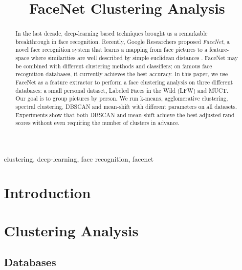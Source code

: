 \documentclass[conference]{IEEEtran}
\begin{document}
\title{FaceNet Clustering Analysis}

\author{
}


\maketitle

\begin{abstract}
In the last decade, deep-learning based techniques brought us a remarkable breakthrough in face recognition.
Recently, Google Researchers proposed \textit{FaceNet}, a novel face recognition system that learns a mapping from face pictures to a feature-space where similarities are well described by simple euclidean distances \cite{??}.
FaceNet may be combined with different clustering methods and classifiers; on famous face recognition databases, it currently achieves the best accuracy.
In this paper, we use FaceNet as a feature extractor to perform a face clustering analysis on three different databases: a small personal dataset, Labeled Faces in the Wild (LFW) and MUCT.
Our goal is to group pictures by person.
We run k-means, agglomerative clustering, spectral clustering, DBSCAN and mean-shift with different parameters on all datasets.
Experiments show that both DBSCAN and mean-shift achieve the best adjusted rand scores without even requiring the number of clusters in advance.

\end{abstract}

\begin{IEEEkeywords}
clustering, deep-learning, face recognition, facenet
\end{IEEEkeywords}

\section{Introduction}

\section{Clustering Analysis}

\subsection{Databases}
\end{document}
